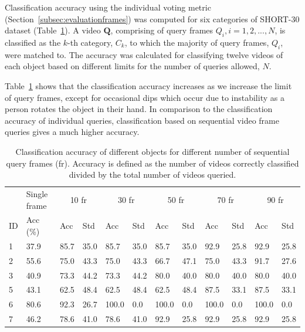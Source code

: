 Classification accuracy using the individual voting metric (Section~\ref{subsec:evaluationframes}) was computed for six categories of SHORT-30 dataset (Table~\ref{table:testData}). A video $\mathbf{Q}$, comprising of query frames $Q_i, i = 1,2,...,N$, is classified as the $k$-th category, $C_k$, to which the majority of query frames, $Q_i$, were matched to. The accuracy was calculated for classifying twelve videos of each object based on different limits for the number of queries allowed, $N$.

Table~\ref{table:testData} shows that the classification accuracy increases as we increase the limit of query frames, except for occasional dips which occur due to instability as a person rotates the object in their hand. In comparison to the classification accuracy of individual queries, classification based on sequential video frame queries gives a much higher accuracy.


\begin{table}
\centering
\begin{tabularx}{1.05\linewidth}{XXXXXXXXXXXX}
\toprule
& Single frame & \multicolumn{2}{c}{10 fr} & \multicolumn{2}{c}{30 fr} & \multicolumn{2}{c}{50 fr} & \multicolumn{2}{c}{70 fr} & \multicolumn{2}{c}{90 fr}\\
ID & Acc (\%) & Acc & Std & Acc & Std & Acc & Std & Acc & Std & Acc & Std \\
\midrule
1 & 37.9 & 85.7 & 35.0 & 85.7 & 35.0 & 85.7 & 35.0 & 92.9 & 25.8 & 92.9 & 25.8 \\
2 & 55.6 & 75.0 & 43.3 & 75.0 & 43.3 & 66.7 & 47.1 & 75.0 & 43.3 & 91.7 & 27.6\\
3 & 40.9 & 73.3 & 44.2 & 73.3 & 44.2 & 80.0 & 40.0 & 80.0 & 40.0 & 80.0 & 40.0\\
5 & 43.1 & 62.5 & 48.4 & 62.5 & 48.4 & 62.5 & 48.4 & 87.5 & 33.1  & 87.5 & 33.1\\
6 & 80.6 & 92.3 & 26.7 & 100.0 & 0.0 & 100.0 & 0.0 & 100.0 & 0.0  & 100.0 & 0.0\\
7 & 46.2 & 78.6 & 41.0 & 78.6 & 41.0 & 92.9 & 25.8 & 92.9 & 25.8  & 92.9 & 25.8\\
\bottomrule
\end{tabularx}
\caption{Classification accuracy of different objects for different number of sequential query frames (fr). Accuracy is defined as the number of videos correctly classified divided by the total number of videos queried.}
\label{table:testData}
\end{table}





